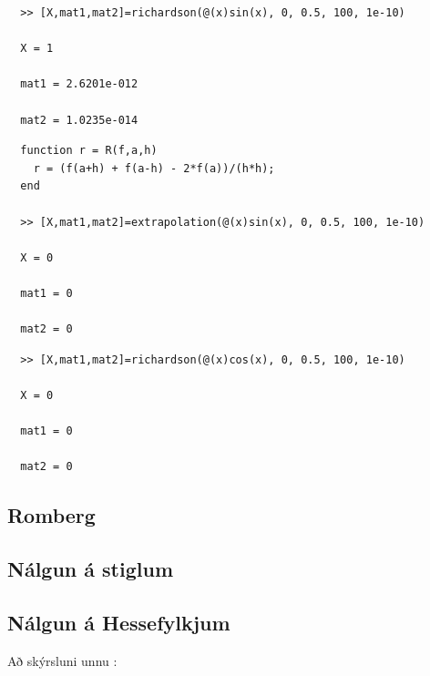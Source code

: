 \documentclass[a4]{article}
\begin{document}
\begin{lstlisting}
  >> [X,mat1,mat2]=richardson(@(x)sin(x), 0, 0.5, 100, 1e-10)

  X = 1

  mat1 = 2.6201e-012

  mat2 = 1.0235e-014
\end{lstlisting}
\begin{lstlisting}
  function r = R(f,a,h)
    r = (f(a+h) + f(a-h) - 2*f(a))/(h*h);
  end

  >> [X,mat1,mat2]=extrapolation(@(x)sin(x), 0, 0.5, 100, 1e-10)

  X = 0

  mat1 = 0

  mat2 = 0
\end{lstlisting}

\begin{lstlisting}
  >> [X,mat1,mat2]=richardson(@(x)cos(x), 0, 0.5, 100, 1e-10)

  X = 0

  mat1 = 0

  mat2 = 0
\end{lstlisting}

\subsection{Romberg}
\subsection{Nálgun á stiglum}
\subsection{Nálgun á Hessefylkjum}
\vspace{20 mm}
Að skýrsluni unnu :
\hspace{0.5cm} \makebox[1.5in]{\hrulefill}
\hspace{0.5cm} \makebox[1.5in]{\hrulefill}
\hspace{0.5cm} \makebox[1.5in]{\hrulefill}
\end{document}
